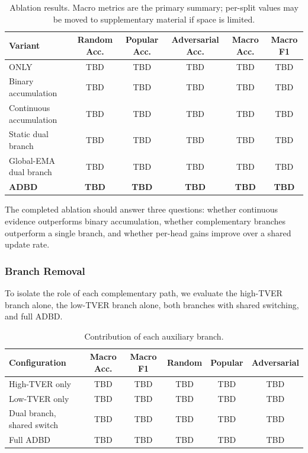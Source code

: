 \begin{table}[t]
\centering
\small
\setlength{\tabcolsep}{5pt}
\begin{tabular}{lccccc}
\toprule
Variant & Random Acc. & Popular Acc. & Adversarial Acc. & Macro Acc. & Macro F1 \\
\midrule
ONLY                    & TBD & TBD & TBD & TBD & TBD \\
Binary accumulation     & TBD & TBD & TBD & TBD & TBD \\
Continuous accumulation & TBD & TBD & TBD & TBD & TBD \\
Static dual branch      & TBD & TBD & TBD & TBD & TBD \\
Global-EMA dual branch  & TBD & TBD & TBD & TBD & TBD \\
\textbf{ADBD}           & \textbf{TBD} & \textbf{TBD} & \textbf{TBD} & \textbf{TBD} & \textbf{TBD} \\
\bottomrule
\end{tabular}
\caption{Ablation results. Macro metrics are the primary summary; per-split values may be moved to supplementary material if space is limited.}
\label{tab:ablation_results}
\end{table}

The completed ablation should answer three questions: whether continuous evidence outperforms binary accumulation, whether complementary branches outperform a single branch, and whether per-head gains improve over a shared update rate. 

\subsubsection{Branch Removal}

To isolate the role of each complementary path, we evaluate the high-TVER branch alone, the low-TVER branch alone, both branches with shared switching, and full ADBD.

\begin{table}[t]
\centering
\small
\setlength{\tabcolsep}{5pt}
\begin{tabular}{lccccc}
\toprule
Configuration & Macro Acc. & Macro F1 & Random & Popular & Adversarial \\
\midrule
High-TVER only              & TBD & TBD & TBD & TBD & TBD \\
Low-TVER only               & TBD & TBD & TBD & TBD & TBD \\
Dual branch, shared switch  & TBD & TBD & TBD & TBD & TBD \\
Full ADBD                   & TBD & TBD & TBD & TBD & TBD \\
\bottomrule
\end{tabular}
\caption{Contribution of each auxiliary branch.}
\label{tab:branch_ablation}
\end{table}

